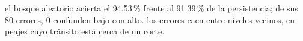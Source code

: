 {el bosque aleatorio acierta el 94.53\,\% frente al 91.39\,\% de la persistencia; de sus 80 errores, 0 confunden bajo con alto.}
{los errores caen entre niveles vecinos, en peajes cuyo tránsito está cerca de un corte.}
